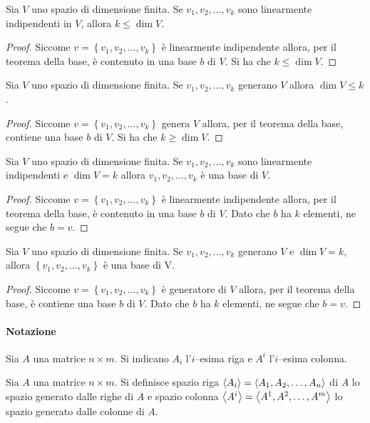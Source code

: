 \begin{theorem}
  Sia $V$ uno spazio di dimensione finita. Se $v_1,v_2,\dots,v_k$ sono linearmente indipendenti in $V$, allora $k\le \dim V$.
\end{theorem}
\begin{proof}
  Siccome $v=\left\{ v_1,v_2,\dots,v_k \right\}$ è linearmente indipendente allora, per il teorema della base, è contenuto in una base $b$ di $V$. Si ha che $k\le \dim V$.
\end{proof}

\begin{theorem}
  Sia $V$ uno spazio di dimensione finita. Se $v_1,v_2,\dots,v_k$ generano $V$ allora $\dim V\le k$.
\end{theorem}
\begin{proof}
  Siccome $v=\left\{ v_1,v_2,\dots,v_k \right\}$ genera $V$ allora, per il teorema della base, contiene una base $b$ di $V$. Si ha che $k\ge \dim V$.
\end{proof}

\begin{theorem}
  Sia $V$ uno spazio di dimensione finita. Se $v_1,v_2,\dots,v_k$ sono linearmente indipendenti e $\dim V=k$ allora $v_1,v_2,\dots,v_k$ è una base di $V$.
\end{theorem}
\begin{proof}
  Siccome $v=\left\{ v_1,v_2,\dots,v_k \right\}$ è linearmente indipendente allora, per il teorema della base, è contenuto in una base $b$ di $V$. Dato che $b$ ha $k$ elementi, ne segue che $b=v$.
\end{proof}

\begin{theorem}
  Sia $V$ uno spazio di dimensione finita. Se $v_1,v_2,\dots,v_k$ generano $V$ e $\dim V=k$, allora $\left\{ v_1,v_2,\dots,v_k \right\}$ è una base di V.
\end{theorem}
\begin{proof}
  Siccome $v=\left\{ v_1,v_2,\dots,v_k \right\}$ è generatore di $V$ allora, per il teorema della base, è contiene una base $b$ di $V$. Dato che $b$ ha $k$ elementi, ne segue che $b=v$.
\end{proof}

\paragraph*{Notazione} Sia $A$ una matrice $n\times m$. Si indicano $A_i$ l'$i$--esima riga e $A^i$ l'$i$--esima colonna.

\begin{definition}
  Sia $A$ una matrice $n\times m$.
  Si definisce spazio riga $\sp{A_i}=\sp{A_1,A_2,\dots,A_n}$ di $A$ lo spazio generato dalle righe di $A$ e spazio colonna $\sp{A^i}=\sp{A^1,A^2,\dots,A^m}$ lo spazio generato dalle colonne di $A$.
\end{definition}

